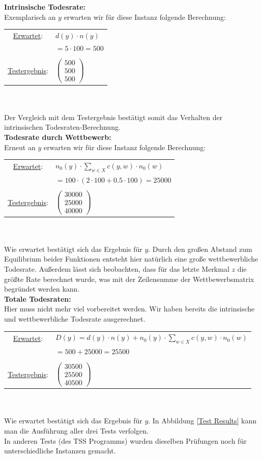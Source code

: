 \documentclass[11pt, a4paper, german]{article}
\theoremstyle{plain}
\newcommand{\trvec}[3]{\begin{pmatrix}#1\\#2\\#3\end{pmatrix}}
\begin{document}
	\textbf{Intrinsische Todesrate:}\\
	Exemplarisch an $ y $ erwarten wir für diese Instanz folgende Berechnung:\\
	\renewcommand{\arraystretch}{1.2}
	\begin{tabular}{c l}
		\underline{Erwartet}: 		& $ d(y) \cdot n(y)  $\\
						& $ = 5 \cdot 100 = 500 $ \\\\
		\underline{Testergebnis}: 	& $ \trvec{500}{500}{500} $
	\end{tabular}\\\\
	Der Vergleich mit dem Testergebnis bestätigt somit das Verhalten der intrinsischen Todesraten-Berechnung.\\
	
	\textbf{Todesrate durch Wettbewerb:}\\
	Erneut an $ y $ erwarten wir für diese Instanz folgende Berechnung:\\
	
	\begin{tabular}{c l}
		\underline{Erwartet}: 		& $ n_0(y) \cdot \sum_{w \in X} c(y,w) \cdot n_0(w) $\\
						& $ = 100 \cdot ( 2 \cdot 100 + 0.5 \cdot 100 ) = 25000 $\\\\
		\underline{Testergebnis}: 	& $ \trvec{30000}{25000}{40000} $
	\end{tabular}\\\\
	Wie erwartet bestätigt sich das Ergebnis für $ y $. Durch den großen Abstand zum Equilibrium beider Funktionen entsteht hier natürlich eine große wettbewerbliche Todesrate. Außerdem lässt sich beobachten, dass für das letzte Merkmal $ z $ die größte Rate berechnet wurde, was mit der Zeilensumme der Wettbewerbsmatrix begründet werden kann.\\
	
	\textbf{Totale Todesraten:}\\
	Hier muss nicht mehr viel vorbereitet werden. Wir haben bereits die intrinsische und wettbewerbliche Todesrate ausgerechnet. \\
	
	\begin{tabular}{c l}
		\underline{Erwartet}: 		& $ D(y) =  d(y) \cdot n(y) + n_0(y) \cdot \sum_{w \in X} c(y,w) \cdot n_0(w) $\\
						& $ = 500 + 25000 = 25500$\\\\
		\underline{Testergebnis}: 	& $ \trvec{30500}{25500}{40500} $
	\end{tabular}\\\\
	Wie erwartet bestätigt sich das Ergebnis für $ y $. In Abbildung \ref{Test Results} kann man die Ausführung aller drei Tests verfolgen.\\
	In anderen Tests (des TSS Programms) wurden dieselben Prüfungen noch für unterschiedliche Instanzen gemacht.\\
	
\end{document}
